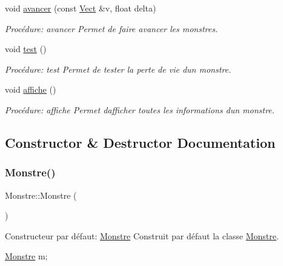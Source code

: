 \begin{DoxyCompactItemize}
void \hyperlink{classMonstre_a5fed7574a7a621251d313219c0831b09}{avancer} (const \hyperlink{classVect}{Vect} \&v, float delta)
\begin{DoxyCompactList}\small\item\em Procédure\+: avancer Permet de faire avancer les monstres. \end{DoxyCompactList}\item 
void \hyperlink{classMonstre_a4f22d17531f5ca164355740d035485ee}{test} ()
\begin{DoxyCompactList}\small\item\em Procédure\+: test Permet de tester la perte de vie d\textquotesingle{}un monstre. \end{DoxyCompactList}\item 
void \hyperlink{classMonstre_ac6700482d005ec983746983f76ad0088}{affiche} ()
\begin{DoxyCompactList}\small\item\em Procédure\+: affiche Permet d\textquotesingle{}afficher toutes les informations d\textquotesingle{}un monstre. \end{DoxyCompactList}\end{DoxyCompactItemize}


\subsection{Constructor \& Destructor Documentation}
\mbox{\label{classMonstre_a8efe47ee8ea4b5ee8e5d3820e620059b}} 
\subsubsection{\texorpdfstring{Monstre()}{Monstre()}\hspace{0.1cm}{\footnotesize\ttfamily [1/3]}}
{\footnotesize\ttfamily Monstre\+::\+Monstre (\begin{DoxyParamCaption}{ }\end{DoxyParamCaption})}



Constructeur par défaut\+: \hyperlink{classMonstre}{Monstre} Construit par défaut la classe \hyperlink{classMonstre}{Monstre}. 


\begin{DoxyCode}
\hyperlink{classMonstre}{Monstre} m;
\end{DoxyCode}
 \mbox{\label{classMonstre_a9097846a3f136f6db0a51b80a3ccc15d}} 
